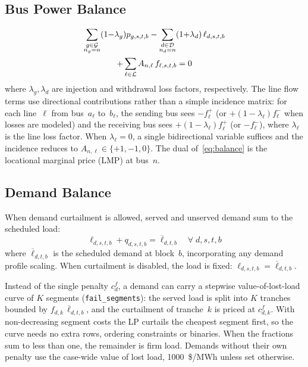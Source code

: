 \subsection{Bus Power Balance}
\label{sec:balance}
\begin{multline}
\label{eq:balance}
\sum_{\substack{g \in \mathcal{G} \\ n_g = n}} (1{-}\lambda_g) p_{g,s,t,b}
- \sum_{\substack{d \in \mathcal{D} \\ n_d = n}}
  (1{+}\lambda_d)\,\ell_{d,s,t,b} \\
+ \sum_{\ell \in \mathcal{L}} A_{n,\ell} \, f_{\ell,s,t,b} = 0
\end{multline}
where $\lambda_g, \lambda_d$ are injection and withdrawal loss factors,
respectively.  The line flow terms use directional contributions rather
than a simple incidence matrix: for each line~$\ell$ from bus~$a_\ell$
to~$b_\ell$, the sending bus sees $-f^+_\ell$ (or $+(1-\lambda_\ell)
f^-_\ell$ when losses are modeled) and the receiving bus sees
$+(1-\lambda_\ell)f^+_\ell$ (or $-f^-_\ell$), where $\lambda_\ell$
is the line loss factor.  When $\lambda_\ell=0$, a single bidirectional
variable suffices and the incidence reduces to $A_{n,\ell} \in
\{+1,-1,0\}$.  The dual of~\eqref{eq:balance} is the locational marginal
price (LMP) at bus~$n$.

\subsection{Demand Balance}

When demand curtailment is allowed, served and unserved demand sum to the
scheduled load:
\begin{equation}
\label{eq:demand_balance}
\ell_{d,s,t,b} + q_{d,s,t,b} = \overline{\ell}_{d,t,b}
\quad \forall\; d, s, t, b
\end{equation}
where $\overline{\ell}_{d,t,b}$ is the scheduled demand at block~$b$,
incorporating any demand profile scaling.  When curtailment is disabled,
the load is fixed: $\ell_{d,s,t,b} = \overline{\ell}_{d,t,b}$.

Instead of the single penalty $c^f_d$, a demand can carry a stepwise
value-of-lost-load curve of $K$ segments (\texttt{fail\_segments}): the
served load is split into $K$ tranches bounded by
$f_{d,k}\,\overline{\ell}_{d,t,b}$, and the curtailment of tranche~$k$
is priced at $c^f_{d,k}$.  With non-decreasing segment costs the LP
curtails the cheapest segment first, so the curve needs no extra rows,
ordering constraints or binaries.  When the fractions sum to less than
one, the remainder is firm load.  Demands without their own penalty use
the case-wide value of lost load, 1000~\$/MWh unless set otherwise.


